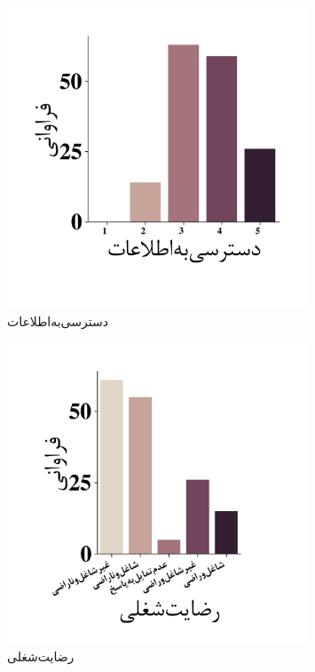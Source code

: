 \begin{figure}[htpb]
    \centering
    \includegraphics[width=0.8\textwidth]{./img/ordinal/InformationQuestion.png}
    \caption{دسترسی‌به‌اطلاعات}
    \label{fig:InformationQuestion}
\end{figure}
\begin{figure}[htpb]
    \centering
    \includegraphics[width=0.8\textwidth]{./img/ordinal/JobSatisfaction.png}
    \caption{رضایت‌شغلی}
    \label{fig:JobSatisfaction}
\end{figure}
